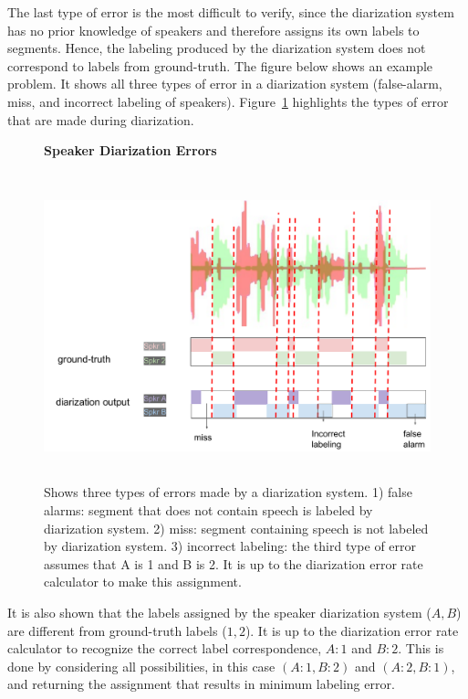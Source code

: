 The last type of error is the most difficult to verify, since the diarization system has no prior knowledge of speakers and therefore assigns its own labels to segments. 
Hence, the labeling produced by the diarization system does not correspond to labels from ground-truth. The figure below shows an example problem. It shows all three types of error in a diarization system (false-alarm, miss, and incorrect labeling of speakers). 
Figure~\ref{fig:ch5_diarization_der} highlights the types of error that are made during diarization. 

\begin{figure}[h!]
	\centering
	\textbf{Speaker Diarization Errors}\par\medskip
	\includegraphics[height = 3.5in, width=1\textwidth]{figures/diarization_example_der}
	\caption{ \small Shows three types of errors made by a diarization system. 1) false alarms: segment that does not contain speech is labeled by diarization system. 2) miss: segment containing speech is not labeled by diarization system. 
		3) incorrect labeling: the third type of error assumes that A is 1 and B is 2. It is up to the diarization error rate calculator to make this assignment.}
	\label{fig:ch5_diarization_der}
	\vspace{-3mm}
\end{figure}

It is also shown that the labels assigned by the speaker diarization system ($A, B$) are different from ground-truth labels ($1, 2$). 
It is up to the diarization error rate calculator to recognize the correct label correspondence, $A:1$ and $B:2$. 
This is done by considering all possibilities, in this case $(A:1,B:2)$ and $(A:2,B:1)$, and returning the assignment that results in minimum labeling error. 


